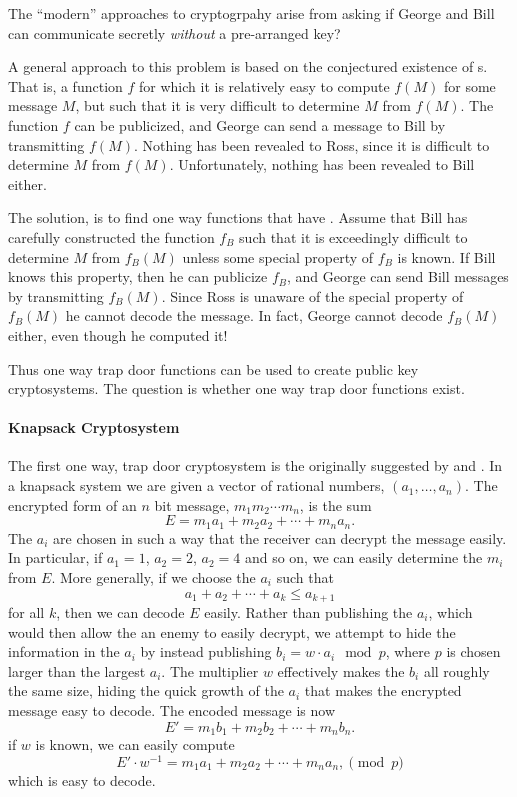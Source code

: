 The ``modern'' approaches to cryptogrpahy arise from asking if George
and Bill can communicate secretly {\em without} a pre-arranged key?

A general approach to this problem is based on the conjectured
existence of s.  That is, a function $f$ for
which it is relatively easy to compute $f(M)$ for some message $M$,
but such that it is very difficult to determine $M$ from $f(M)$.  The
function $f$ can be publicized, and George can send a message to Bill
by transmitting $f(M)$.  Nothing has been revealed to Ross, since it
is difficult to determine $M$ from $f(M)$.  Unfortunately, nothing has
been revealed to Bill either.

The solution, is to find one way functions that have .
Assume that Bill has carefully constructed the function $f_B$ such
that it is exceedingly difficult to determine $M$ from $f_B(M)$ unless
some special property of $f_B$ is known.  If Bill knows this property,
then he can publicize $f_B$, and George can send Bill messages by
transmitting $f_B(M)$.  Since Ross is unaware of the special property
of $f_B(M)$ he cannot decode the message.  In fact, George cannot decode
$f_B(M)$ either, even though he computed it!

Thus one way trap door functions can be used to create public key
cryptosystems.  The question is whether one way trap door functions exist.  


\paragraph{Knapsack Cryptosystem}

The first one way, trap door cryptosystem is the  originally suggested by {\Merkle} and {\Hellman}
\cite{Merkle1978-wm}.  In a knapsack system we are given a vector of
rational numbers, $(a_1, \ldots, a_n)$.  The encrypted form of an $n$
bit message, $m_1 m_2 \cdots m_n$, is the sum
\[
E = m_1 a_1 + m_2 a_2 + \cdots + m_n a_n.
\]
The $a_i$ are chosen in such a way that the receiver can decrypt the
message easily.  In particular, if $a_1 = 1$, $a_2 = 2$, $a_2 = 4$ and
so on, we can easily determine the $m_i$ from $E$.  More generally, if
we choose the $a_i$ such that 
\[
a_1 + a_2 + \cdots + a_k \le a_{k+1}
\]
for all $k$, then we can decode $E$ easily.  Rather than publishing the
$a_i$, which would then allow the an enemy to easily decrypt, we attempt
to hide the information in the $a_i$ by instead publishing
$b_i =  w \cdot a_i \mod{p}$, where $p$ is chosen larger than the
largest $a_i$.  The multiplier $w$ effectively makes the $b_i$ all
roughly the same size, hiding the quick growth of the $a_i$ that makes
the encrypted message easy to decode.  The encoded message is now
\[
E' = m_1 b_1 + m_2 b_2 + \cdots + m_n b_n.
\]
if $w$ is known, we can easily compute
\[
E' \cdot w^{-1} = m_1 a_1 + m_2 a_2 + \cdots + m_n a_n,
\pmod{p}
\]
which is easy to decode.

